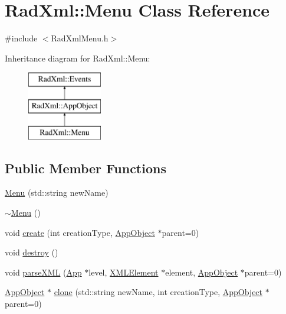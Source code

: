 \hypertarget{class_rad_xml_1_1_menu}{\section{Rad\-Xml\-:\-:Menu Class Reference}
\label{class_rad_xml_1_1_menu}
}


{\ttfamily \#include $<$Rad\-Xml\-Menu.\-h$>$}

Inheritance diagram for Rad\-Xml\-:\-:Menu\-:\begin{figure}[H]
\begin{center}
\leavevmode
\includegraphics[height=3.000000cm]{class_rad_xml_1_1_menu}
\end{center}
\end{figure}
\subsection*{Public Member Functions}
\begin{DoxyCompactItemize}
\item 
\hyperlink{class_rad_xml_1_1_menu_a0c86a6f446ea86449c2885fa46f855e3}{Menu} (std\-::string new\-Name)
\item 
\hyperlink{class_rad_xml_1_1_menu_a4e02faec295142b1b4a26a7f3742d0a3}{$\sim$\-Menu} ()
\item 
void \hyperlink{class_rad_xml_1_1_menu_a6dcf488f0556d27c356b12f4314446ac}{create} (int creation\-Type, \hyperlink{class_rad_xml_1_1_app_object}{App\-Object} $\ast$parent=0)
\item 
void \hyperlink{class_rad_xml_1_1_menu_aaffac34b5442ecb69fcc87e725dd0659}{destroy} ()
\item 
void \hyperlink{class_rad_xml_1_1_menu_a6cb42b32711eb53ed1c593036ddb4da0}{parse\-X\-M\-L} (\hyperlink{class_rad_xml_1_1_app}{App} $\ast$level, \hyperlink{class_x_m_l_element}{X\-M\-L\-Element} $\ast$element, \hyperlink{class_rad_xml_1_1_app_object}{App\-Object} $\ast$parent=0)
\item 
\hyperlink{class_rad_xml_1_1_app_object}{App\-Object} $\ast$ \hyperlink{class_rad_xml_1_1_menu_ad321e0604be2eba8f29924561031557b}{clone} (std\-::string new\-Name, int creation\-Type, \hyperlink{class_rad_xml_1_1_app_object}{App\-Object} $\ast$parent=0)
\end{DoxyCompactItemize}

